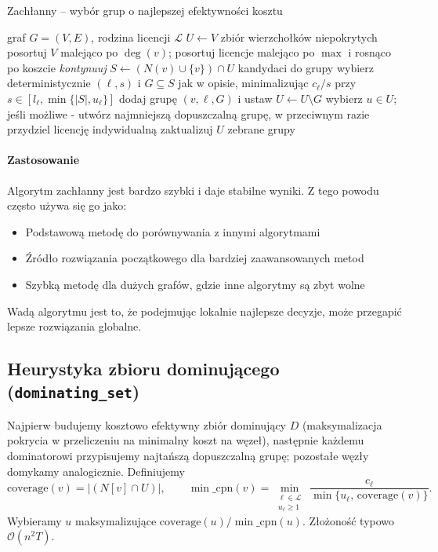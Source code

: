 \begin{algorithm}[H]
\caption{Zachłanny -- wybór grup o najlepszej efektywności kosztu}
\label{alg:greedy}
\begin{algorithmic}[1]
\Require graf $G=(V,E)$, rodzina licencji $\mathcal{L}$
\State $U \gets V$ \Comment zbiór wierzchołków niepokrytych
\State posortuj $V$ malejąco po $\deg(v)$; posortuj licencje malejąco po $\max$ i rosnąco po koszcie
   \State \textit{kontynuuj} \EndIf
  \State $S \gets (N(v)\cup\{v\})\cap U$ \Comment kandydaci do grupy
  \State wybierz deterministycznie $(\ell,s)$ i $G\subseteq S$ jak w opisie, minimalizując $c_\ell/s$ przy $s\in[l_\ell,\min\{|S|,u_\ell\}]$
    \State dodaj grupę $(v,\ell,G)$ i ustaw $U\gets U\setminus G$
  \EndIf
\EndFor
{}
  \State wybierz $u\in U$; jeśli możliwe - utwórz najmniejszą dopuszczalną grupę, w przeciwnym razie przydziel licencję indywidualną
  \State zaktualizuj $U$
\EndWhile
\State \Return zebrane grupy
\end{algorithmic}
\end{algorithm}

\paragraph{Zastosowanie}
Algorytm zachłanny jest bardzo szybki i daje stabilne wyniki. Z tego powodu często używa się go jako:
\begin{itemize}
  \item Podstawową metodę do porównywania z innymi algorytmami
  \item Źródło rozwiązania początkowego dla bardziej zaawansowanych metod
  \item Szybką metodę dla dużych grafów, gdzie inne algorytmy są zbyt wolne
\end{itemize}
Wadą algorytmu jest to, że podejmując lokalnie najlepsze decyzje, może przegapić lepsze rozwiązania globalne.

\subsection{Heurystyka zbioru dominującego (\texttt{dominating\_set})}\label{subsec:ds}

Najpierw budujemy kosztowo efektywny zbiór dominujący $D$ (maksymalizacja pokrycia w przeliczeniu na minimalny koszt na węzeł), następnie każdemu dominatorowi przypisujemy najtańszą dopuszczalną grupę; pozostałe węzły domykamy analogicznie. Definiujemy
\[
\mathrm{coverage}(v)=|(N[v]\cap U)|,\qquad \min\_\mathrm{cpn}(v)=\min\limits_{\substack{\ell\in\mathcal{L} \\ u_\ell\ge 1}}\ \frac{c_\ell}{\min\{u_\ell,\,\mathrm{coverage}(v)\}}.
\]
Wybieramy $u$ maksymalizujące $\mathrm{coverage}(u)/\min\_\mathrm{cpn}(u)$. Złożoność typowo $\mathcal{O}(n^2T)$.

